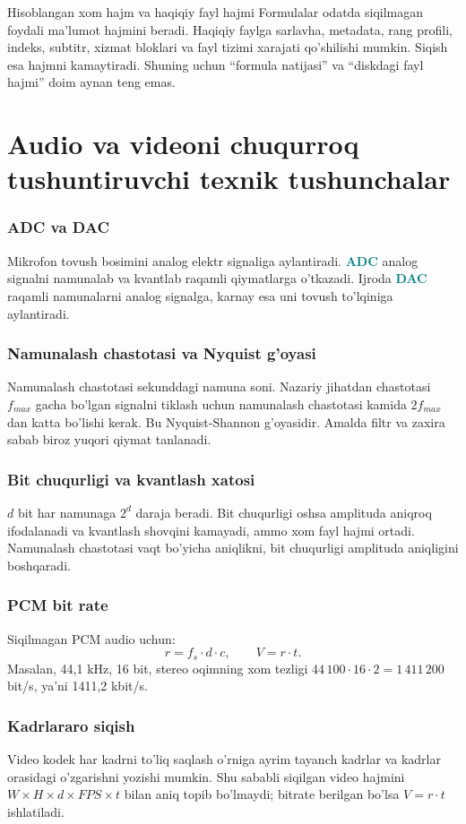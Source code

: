 \documentclass[11pt,a4paper,oneside]{book}
\newcommand{\term}[1]{\textbf{\textcolor{Teal}{#1}}\index{#1}}
\begin{document}
\begin{warningbox}{Hisoblangan xom hajm va haqiqiy fayl hajmi}
Formulalar odatda siqilmagan foydali ma'lumot hajmini beradi. Haqiqiy faylga sarlavha, metadata, rang profili, indeks, subtitr, xizmat bloklari va fayl tizimi xarajati qo'shilishi mumkin. Siqish esa hajmni kamaytiradi. Shuning uchun “formula natijasi” va “diskdagi fayl hajmi” doim aynan teng emas.
\end{warningbox}
\section{Audio va videoni chuqurroq tushuntiruvchi texnik tushunchalar}
\subsubsection{ADC va DAC}
Mikrofon tovush bosimini analog elektr signaliga aylantiradi. \term{ADC} analog signalni namunalab va kvantlab raqamli qiymatlarga o'tkazadi. Ijroda \term{DAC} raqamli namunalarni analog signalga, karnay esa uni tovush to'lqiniga aylantiradi.
\subsubsection{Namunalash chastotasi va Nyquist g'oyasi}
Namunalash chastotasi sekunddagi namuna soni. Nazariy jihatdan chastotasi $f_{max}$ gacha bo'lgan signalni tiklash uchun namunalash chastotasi kamida $2f_{max}$ dan katta bo'lishi kerak. Bu Nyquist-Shannon g'oyasidir. Amalda filtr va zaxira sabab biroz yuqori qiymat tanlanadi.
\subsubsection{Bit chuqurligi va kvantlash xatosi}
$d$ bit har namunaga $2^d$ daraja beradi. Bit chuqurligi oshsa amplituda aniqroq ifodalanadi va kvantlash shovqini kamayadi, ammo xom fayl hajmi ortadi. Namunalash chastotasi vaqt bo'yicha aniqlikni, bit chuqurligi amplituda aniqligini boshqaradi.
\subsubsection{PCM bit rate}
Siqilmagan PCM audio uchun:
\[
r=f_s\cdot d\cdot c,
\qquad V=r\cdot t.
\]
Masalan, 44,1 kHz, 16 bit, stereo oqimning xom tezligi $44\,100\cdot16\cdot2=1\,411\,200$ bit/s, ya'ni 1411,2 kbit/s.
\subsubsection{Kadrlararo siqish}
Video kodek har kadrni to'liq saqlash o'rniga ayrim tayanch kadrlar va kadrlar orasidagi o'zgarishni yozishi mumkin. Shu sababli siqilgan video hajmini $W\times H\times d\times FPS\times t$ bilan aniq topib bo'lmaydi; bitrate berilgan bo'lsa $V=r\cdot t$ ishlatiladi.
\end{document}
